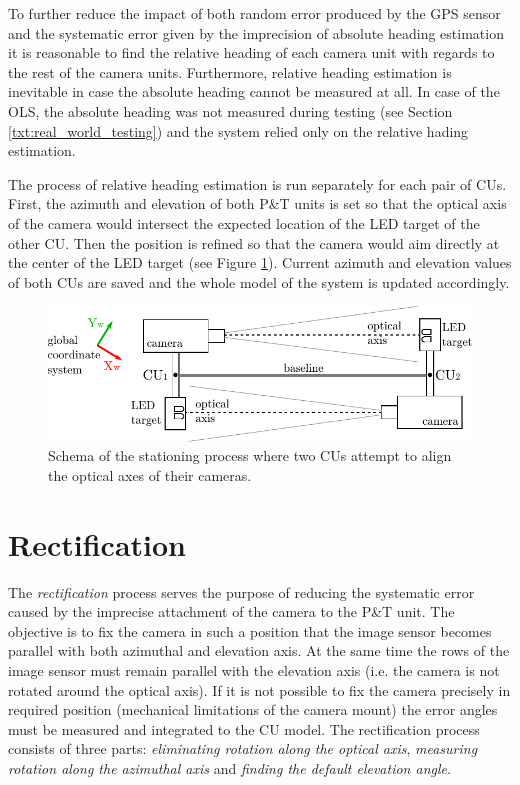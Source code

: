 To further reduce the impact of both random error produced by the GPS sensor and the systematic error given by the imprecision of absolute heading estimation it is reasonable to find the relative heading of each camera unit with regards to the rest of the camera units. Furthermore, relative heading estimation is inevitable in case the absolute heading cannot be measured at all. In case of the OLS, the absolute heading was not measured during testing (see Section \ref{txt:real_world_testing}) and the system relied only on the relative hading estimation.

The process of relative heading estimation is run separately for each pair of CUs. First, the azimuth and elevation of both P\&T units is set so that the optical axis of the camera would intersect the expected location of the LED target of the other CU. Then the position is refined so that the camera would aim directly at the center of the LED target (see Figure \ref{fig:stationing_aiming}). Current azimuth and elevation values of both CUs are saved and the whole model of the system is updated accordingly.

\begin{figure}[htb]
	\centering
	\includegraphics[width=0.7\linewidth]{fig/stationing.pdf}
	\caption{Schema of the stationing process where two CUs attempt to align the optical axes of their cameras.}
	\label{fig:stationing_aiming}
\end{figure}

\section{Rectification} \label{txt:rectification}

The \textit{rectification} process serves the purpose of reducing the systematic error caused by the imprecise attachment of the camera to the P\&T unit. The objective is to fix the camera in such a position that the image sensor becomes parallel  with both azimuthal and elevation axis. At the same time the rows of the image sensor must remain parallel with the elevation axis (i.e. the camera is not rotated around the optical axis). If it is not possible to fix the camera precisely in required position (mechanical limitations of the camera mount) the error angles must be measured and integrated to the CU model. The rectification process consists of three parts: \textit{eliminating rotation along the optical axis}, \textit{measuring rotation along the azimuthal axis} and \textit{finding the default elevation angle}.

